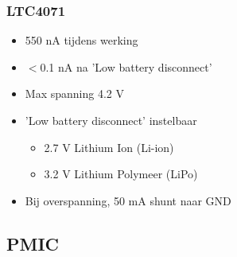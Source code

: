     \begin{frame}
        \frametitle{LTC4071}
        \begin{itemize}
            \item 550 nA tijdens werking
            \item $<$0.1 nA na 'Low battery disconnect'
            \item Max spanning 4.2 V
            \item 'Low battery disconnect' instelbaar
                \begin{itemize}
                    \item 2.7 V Lithium Ion (Li-ion)
                    \item 3.2 V Lithium Polymeer (LiPo)
                \end{itemize}
            \item Bij overspanning, 50 mA shunt naar GND
        \end{itemize}

    \end{frame}

    \subsection{PMIC}

    
        
    
